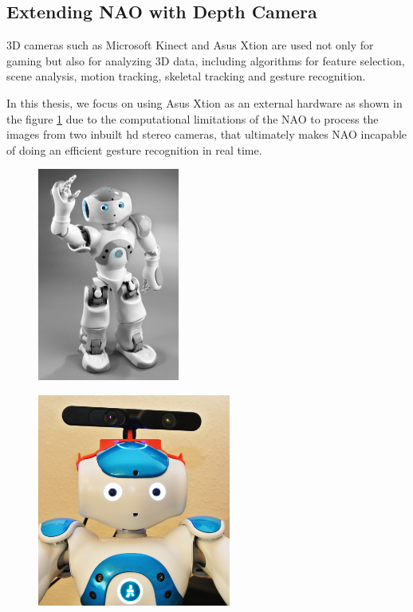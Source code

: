 \subsection{Extending NAO with Depth Camera} 
3D cameras such as Microsoft Kinect and Asus Xtion are used not only for gaming but also for analyzing 3D data, including algorithms for feature selection, scene analysis, motion tracking, skeletal tracking and gesture recognition. 

In this thesis, we focus on using Asus Xtion as an external hardware as shown in the figure \ref{fig:xtion} due to the computational limitations of the NAO to process the images from two inbuilt hd stereo cameras, that ultimately makes NAO incapable of doing an efficient gesture recognition in real time.

\begin{figure}
	\centering
	\begin{minipage}{.5\textwidth}
		\centering
\includegraphics[height=7cm]{figures/nao.png} 
		\label{fig:nao}
	\end{minipage}%
	\begin{minipage}{.5\textwidth}
		\centering
\includegraphics[height=7cm]{figures/nao-xtion.png} 
		\label{fig:xtion}
	\end{minipage}
\end{figure}


